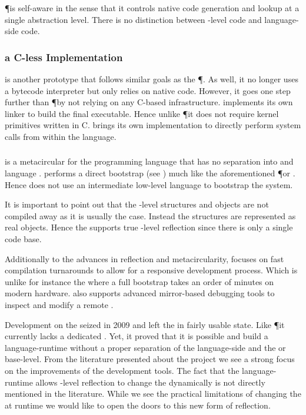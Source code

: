 \P is self-aware in the sense that it controls  native code generation and lookup at a single abstraction level.
There is no distinction between \VM-level code and language-side code.

\subsubsection*{\MIST a C-less \ST Implementation}
 is another prototype \ST \VM that follows similar goals as the \P \VM.
As well, it no longer uses a bytecode interpreter but only relies on native code.
However, it goes one step further than \P by not relying on any C-based infrastructure.
\MIST implements its own linker to build the final executable.
Hence unlike \P it does not require kernel primitives written in C.
\MIST brings its own implementation to directly perform system calls from within the language.

\subsubsection*{\Klein \VM}

 is a metacircular \VM for the \Self programming language that has no separation into \VM and language \cite{Unga05a}.
\Klein performs a direct bootstrap (see ) much like the aforementioned \P or \MIST \VM.
Hence \Klein does not use an intermediate low-level language to bootstrap the system.

It is important to point out that the \VM-level structures and objects are not compiled away as it is usually the case.
Instead the \VM structures are represented as real \Self objects.
Hence the \Klein \VM supports true \VM-level reflection since there is only a single code base.

Additionally to the advances in reflection and metacircularity, \Klein focuses on fast compilation turnarounds to allow for a responsive development process.
Which is unlike for instance the \Squeak \VM where a full \VM bootstrap takes an order of minutes on modern hardware.
\Klein also supports advanced mirror-based debugging tools to inspect and modify a remote \VM.

Development on the \Klein \VM seized in 2009 and left the \Klein \VM in fairly usable state.
Like \P it currently lacks a dedicated \GC.
Yet, it proved that it is possible and build a language-runtime without a proper separation of the language-side and the \VM or base-level.
From the literature presented about the \Klein project we see a strong focus on the improvements of the development tools.
The fact that the language-runtime allows \VM-level reflection to change the \VM dynamically is not directly mentioned in the literature.
While we see the practical limitations of changing the \VM at runtime we would like to open the doors to this new form of reflection.


